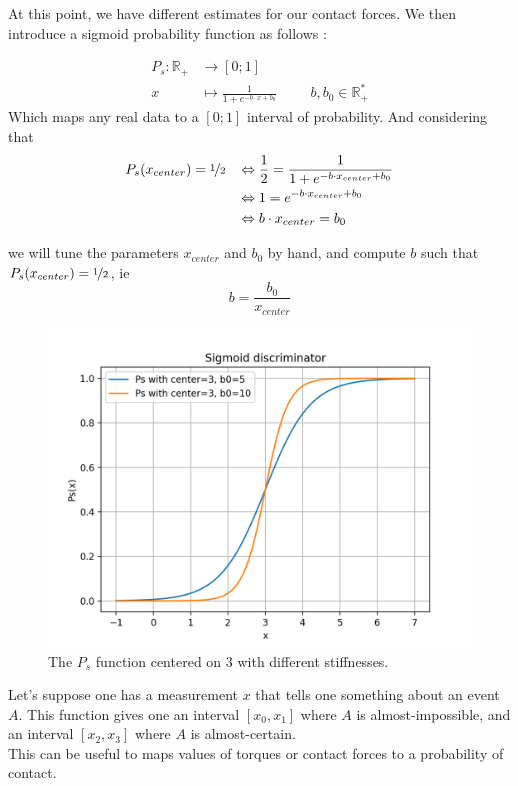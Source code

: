 \documentclass[a4paper,10pt]{article}
\begin{document}
At this point, we have different estimates for our contact forces. We then introduce a sigmoid probability function as follows :

\begin{align*}
  P_s : \mathbb{R}_+ &\rightarrow [0; 1]\\
  x &\mapsto \frac{1}{1 + e^{-b \cdot x + b_0}} \hspace{1cm} b, b_0  \in\mathbb{R}_+^*
\end{align*}
Which maps any real data to a $[0; 1]$ interval of probability.
And considering that
\begin{align*}
	P_s(x_{center}) = \nicefrac{1}{2} \hspace{3mm} &\Leftrightarrow \frac{1}{2} = \frac{1}{1 + e^{-b \cdot x_{center} + b_0}}\\
						&\Leftrightarrow 1  =e^{-b \cdot x_{center} + b_0}\\
						&\Leftrightarrow b\cdot x_{center} = b_0
\end{align*}

we will tune the parameters $x_{center}$ and $b_0$ by hand, and compute $b$ such that $P_s(x_{center}) = \nicefrac{1}{2} $, ie
$$b = \frac{b_0}{x_{center}}$$

\begin{figure}[H]
\label{fig:sigmoid}
\centering
  \includegraphics[width=\linewidth, angle=0, scale=0.8]{./images/ProbDisc_1.png}
  \caption{The $P_s$ function centered on $3$ with different stiffnesses.}
\end{figure}

Let's suppose one has a measurement $x$ that tells one something about an event $A$. This function gives one an interval $[x_0, x_1]$ where $A$ is almost-impossible, and an interval $[x_2, x_3]$ where $A$ is almost-certain.\\
This can be useful to maps values of torques or contact forces to a probability of contact.
\end{document}

